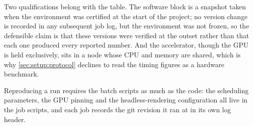 Two qualifications belong with the table. The software block is a snapshot taken when the
environment was certified at the start of the project; no version change is recorded in any
subsequent job log, but the environment was not frozen, so the defensible claim is that these
versions were verified at the outset rather than that each one produced every reported number.
And the accelerator, though the GPU is held exclusively, sits in a node whose CPU and memory are
shared, which is why \autoref{sec:setup:protocol} declines to read the timing figures as a hardware
benchmark.

Reproducing a run requires the batch scripts as much as the code: the scheduling parameters, the
GPU pinning and the headless-rendering configuration all live in the job scripts, and each job
records the git revision it ran at in its own log header.


